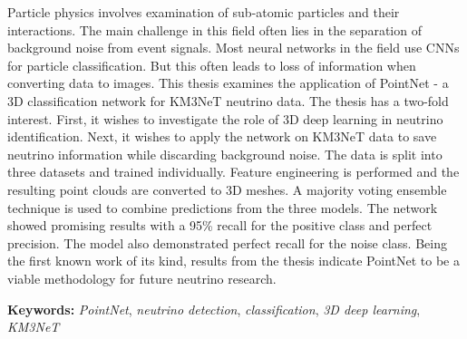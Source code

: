 \begin{abstracts}  

Particle physics involves examination of sub-atomic particles and their interactions. The main challenge in this field often lies in the separation of background noise from event signals. Most neural networks in the field use CNNs for particle classification. But this often leads to loss of information when converting data to images. This thesis examines the application of PointNet - a 3D classification network for KM3NeT neutrino data. The thesis has a two-fold interest. First, it wishes to investigate the role of 3D deep learning in neutrino identification. Next, it wishes to apply the network on KM3NeT data to save neutrino information while discarding background noise. The data is split into three datasets and trained individually. Feature engineering is performed and the resulting point clouds are converted to 3D meshes. A majority voting ensemble technique is used to combine predictions from the three models. The network showed promising results with a 95\% recall for the positive class and perfect precision. The model also demonstrated perfect recall for the noise class. Being the first known work of its kind, results from the thesis indicate PointNet to be a viable methodology for future neutrino research.

{\bf Keywords:} \textit{PointNet}, \textit{neutrino detection}, \textit{classification}, \textit{3D deep learning}, \textit{KM3NeT}
\end{abstracts}


